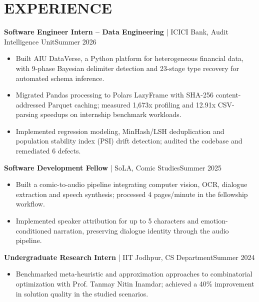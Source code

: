 \documentclass[10pt,a4paper]{article}
\begin{document}
\section*{EXPERIENCE}
\textbf{Software Engineer Intern -- Data Engineering} | ICICI Bank, Audit Intelligence Unit\hfill Summer 2026
\begin{itemize}
\item Built AIU DataVerse, a Python platform for heterogeneous financial data, with 9-phase Bayesian delimiter detection and 23-stage type recovery for automated schema inference.
\item Migrated Pandas processing to Polars LazyFrame with SHA-256 content-addressed Parquet caching; measured 1,673x profiling and 12.91x CSV-parsing speedups on internship benchmark workloads.
\item Implemented regression modeling, MinHash/LSH deduplication and population stability index (PSI) drift detection; audited the codebase and remediated 6 defects.
\end{itemize}
\textbf{Software Development Fellow} | SoLA, Comic Studies\hfill Summer 2025
\begin{itemize}
\item Built a comic-to-audio pipeline integrating computer vision, OCR, dialogue extraction and speech synthesis; processed 4 pages/minute in the fellowship workflow.
\item Implemented speaker attribution for up to 5 characters and emotion-conditioned narration, preserving dialogue identity through the audio pipeline.
\end{itemize}
\textbf{Undergraduate Research Intern} | IIT Jodhpur, CS Department\hfill Summer 2024
\begin{itemize}
\item Benchmarked meta-heuristic and approximation approaches to combinatorial optimization with Prof. Tanmay Nitin Inamdar; achieved a 40\% improvement in solution quality in the studied scenarios.
\end{itemize}
\end{document}
